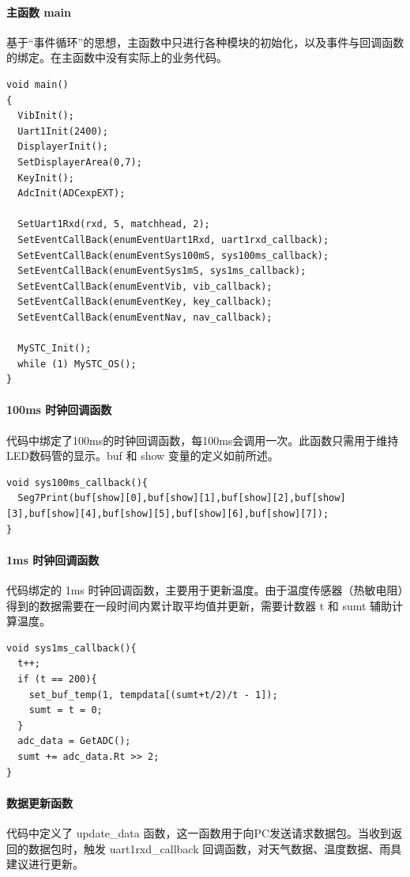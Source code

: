 \documentclass{article}
\begin{document}
\paragraph{主函数 main} 基于“事件循环”的思想，主函数中只进行各种模块的初始化，以及事件与回调函数的绑定。在主函数中没有实际上的业务代码。

\begin{verbatim}
void main()
{
  VibInit();
  Uart1Init(2400);
  DisplayerInit();
  SetDisplayerArea(0,7);
  KeyInit();
  AdcInit(ADCexpEXT);

  SetUart1Rxd(rxd, 5, matchhead, 2);
  SetEventCallBack(enumEventUart1Rxd, uart1rxd_callback);
  SetEventCallBack(enumEventSys100mS, sys100ms_callback);
  SetEventCallBack(enumEventSys1mS, sys1ms_callback);
  SetEventCallBack(enumEventVib, vib_callback);
  SetEventCallBack(enumEventKey, key_callback);
  SetEventCallBack(enumEventNav, nav_callback);

  MySTC_Init();
  while (1) MySTC_OS();
}
\end{verbatim}

\paragraph{100ms 时钟回调函数} 代码中绑定了100ms的时钟回调函数，每100ms会调用一次。此函数只需用于维持LED数码管的显示。buf 和 show 变量的定义如前所述。

\begin{verbatim}
void sys100ms_callback(){
  Seg7Print(buf[show][0],buf[show][1],buf[show][2],buf[show][3],buf[show][4],buf[show][5],buf[show][6],buf[show][7]);
}
\end{verbatim}

\paragraph{1ms 时钟回调函数} 代码绑定的 1ms 时钟回调函数，主要用于更新温度。由于温度传感器（热敏电阻）得到的数据需要在一段时间内累计取平均值并更新，需要计数器 t 和 sumt 辅助计算温度。

\begin{verbatim}
void sys1ms_callback(){
  t++;
  if (t == 200){
    set_buf_temp(1, tempdata[(sumt+t/2)/t - 1]);
    sumt = t = 0;
  }
  adc_data = GetADC();
  sumt += adc_data.Rt >> 2;
}
\end{verbatim}

\paragraph{数据更新函数} 代码中定义了 update\_data 函数，这一函数用于向PC发送请求数据包。当收到返回的数据包时，触发 uart1rxd\_callback 回调函数，对天气数据、温度数据、雨具建议进行更新。
\end{document}
